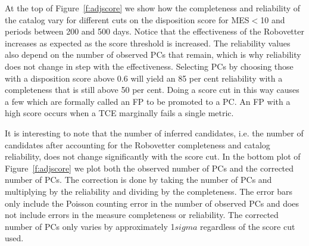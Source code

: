 At the top of Figure~\ref{f:adjscore} we show how the completeness and reliability of the catalog vary for different cuts on the disposition score for MES$<$10 and periods between 200 and 500 days. Notice that the effectiveness of the Robovetter increases as expected as the score threshold is increased. The reliability values also depend on the number of observed PCs that remain, which is why reliability does not change in step with the effectiveness. Selecting PCs by choosing those with a disposition score above 0.6 will yield an 85 per cent reliability with a completeness that is still above 50 per cent. Doing a score cut in this way causes a few  which are formally called an FP to be promoted to a PC. An FP with a high score occurs when a TCE marginally fails a single metric.  

It is interesting to note that the number of inferred candidates, i.e. the number of candidates after accounting for the Robovetter completeness and catalog reliability, does not change significantly with the score cut. In the bottom plot of Figure~\ref{f:adjscore} we plot both the observed number of PCs and the corrected number of PCs.  The correction is done by taking the number of PCs and multiplying by the reliability and dividing by the completeness.  The error bars only include the Poisson counting error in the number of observed PCs and does not include errors in the measure completeness or reliability. The corrected number of PCs only varies by approximately 1$sigma$ regardless of the score cut used.   

